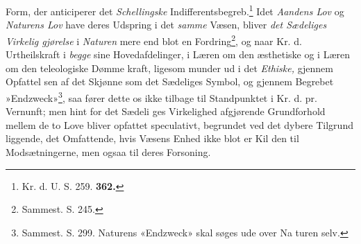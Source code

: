 Form, der anticiperer det \emph{Schellingske} Indifferentsbegreb.\footnote{Kr.
d. U. S. 259. \textbf{362.}}
Idet \emph{Aandens Lov} og \emph{Naturens Lov} have deres Udspring
i det \emph{samme} Væsen, bliver \emph{det Sædeliges Virkelig\-%
gjørelse} i \emph{Naturen} mere end blot en Fordring\footnote{Sammest.
S. 245.}, og naar
Kr. d. Urtheilskraft i \emph{begge} sine Hovedafdelinger, i Læren
om den æsthetiske og i Læren om den teleologiske Dømme\-%
kraft, ligesom munder ud i det \emph{Ethiske,} gjennem Opfattel\-%
sen af det Skjønne som det Sædeliges Symbol, og gjennem
Begrebet »Endzweck»\footnote{Sammest. S. 299. Naturens «Endzweck» skal søges
ude over Na\-%
turen selv.}, saa fører dette os ikke tilbage til
Standpunktet i Kr. d. pr. Vernunft; men hint for det Sædeli\-%
ges Virkelighed afgjørende Grundforhold mellem de to Love
bliver opfattet speculativt, begrundet ved det dybere Tilgrund\-%
liggende, det Omfattende, hvis Væsens Enhed ikke blot er Kil\-%
den til Modsætningerne, men ogsaa til deres Forsoning.

